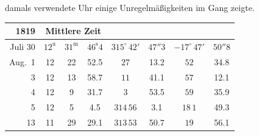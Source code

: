 damals verwendete Uhr einige Unregelmäßigkeiten im Gang zeigte.

\begin{center}
\begin{tabular}{r|ccc|cc|cc}
1819 & \multicolumn{3}{c|}{Mittlere Zeit} & \multicolumn{2}{c|}{} & \multicolumn{2}{c}{} \\
\hline
Juli 30 & $12^{\mathrm{u}}$ & $31^{\mathrm{m}}$ & $46^{\mathrm{s}}4$ & $315^{\circ}\,42'$ & $47''3$ & $-17^{\circ}\,47'$ & $50''8$ \\
Aug.\ 1 & 12 & 22 & 52.5 & $27$ & 13.2 & $52$ & 34.8 \\
3 & 12 & 13 & 58.7 & $11$ & 41.1 & $57$ & 12.1 \\
4 & 12 & 9 & 31.7 & $3$ & 53.5 & $59$ & 35.9 \\
5 & 12 & 5 & 4.5 & $314\,56$ & 3.1 & $18\,1$ & 49.3 \\
13 & 11 & 29 & 29.1 & $313\,53$ & 50.7 & $19$ & 56.1 \\
\end{tabular}
\end{center}

